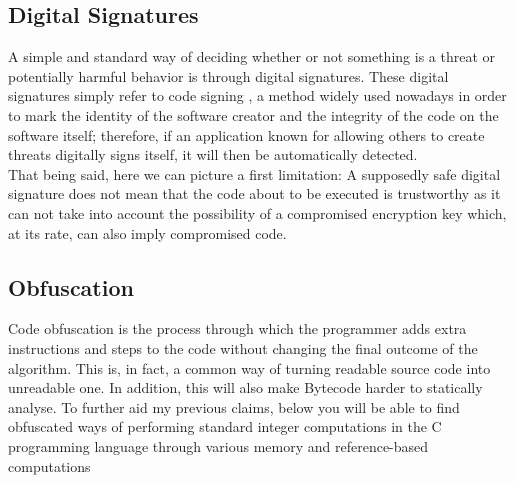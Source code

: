 


\subsection{Digital Signatures}   %
A simple and standard way of deciding whether or not something is a threat or potentially harmful behavior is through digital signatures. These digital signatures simply refer to code signing \cite{bencsath2012duqu}, a method widely used nowadays in order to mark the identity of the software creator and the integrity of the code on the software itself; therefore, if an application known for allowing others to create threats digitally signs itself, it will then be automatically detected. \\



\noindent That being said, here we can picture a first limitation: A supposedly safe digital signature does not mean that the code about to be executed is trustworthy as it can not take into account the possibility of a compromised encryption key which, at its rate, can also imply compromised code.

\subsection{Obfuscation}
Code obfuscation is the process through which the programmer adds extra instructions and steps to the code without changing the final outcome of the algorithm. This is, in fact, a common way of turning readable source code into unreadable one. In addition, this will also make Bytecode harder to statically analyse. To further aid my previous claims, below you will be able to find obfuscated ways of performing standard integer computations in the C programming language through various memory and reference-based computations 



